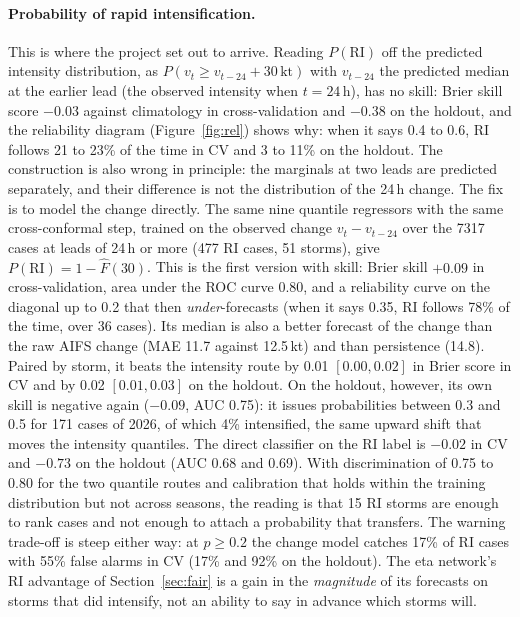 \documentclass[11pt]{article}
\begin{document}
\paragraph{Probability of rapid intensification.} This is where the project set out to arrive.
Reading $P(\mathrm{RI})$ off the predicted intensity distribution, as
$P(v_{t} \ge v_{t-24} + 30\,\mathrm{kt})$ with $v_{t-24}$ the predicted median at the earlier
lead (the observed intensity when $t = 24$\,h), has no skill: Brier skill score $-0.03$ against
climatology in cross-validation and $-0.38$ on the holdout, and the reliability diagram
(Figure~\ref{fig:rel}) shows why: when it says 0.4 to 0.6, RI follows 21 to 23\% of the time in
CV and 3 to 11\% on the holdout. The construction is also wrong in principle: the marginals at two leads are predicted separately, and their difference is not the
distribution of the 24\,h change. The fix is to model the change directly. The same nine quantile
regressors with the same cross-conformal step, trained on the observed change $v_t - v_{t-24}$
over the 7317 cases at leads of 24\,h or more (477 RI cases, 51 storms), give
$P(\mathrm{RI}) = 1 - \hat F(30)$. This is the first version with skill: Brier skill $+0.09$ in
cross-validation, area under the ROC curve 0.80, and a reliability curve on the diagonal up to
0.2 that then \emph{under}-forecasts (when it says 0.35, RI follows 78\% of the time, over 36
cases). Its median is also a better forecast of the change than the raw AIFS change (MAE 11.7
against 12.5\,kt) and than persistence (14.8). Paired by storm, it beats the intensity route by
0.01 $[0.00, 0.02]$ in Brier score in CV and by 0.02 $[0.01, 0.03]$ on the holdout. On the
holdout, however, its own skill is negative again ($-0.09$, AUC 0.75): it issues probabilities
between 0.3 and 0.5 for 171 cases of 2026, of which 4\% intensified, the same upward shift that
moves the intensity quantiles. The direct classifier on the RI label is $-0.02$ in CV and
$-0.73$ on the holdout (AUC 0.68 and 0.69). With discrimination of 0.75 to 0.80 for the two quantile routes and
calibration that holds within the training distribution but not across seasons, the reading is
that 15 RI storms are enough to rank cases and not enough to attach a probability that transfers.
The warning trade-off is steep either way: at $p \ge 0.2$ the change model catches 17\% of RI
cases with 55\% false alarms in CV (17\% and 92\% on the holdout). The eta network's RI advantage
of Section~\ref{sec:fair} is a gain in the \emph{magnitude} of its forecasts on storms that did
intensify, not an ability to say in advance which storms will.
\end{document}
